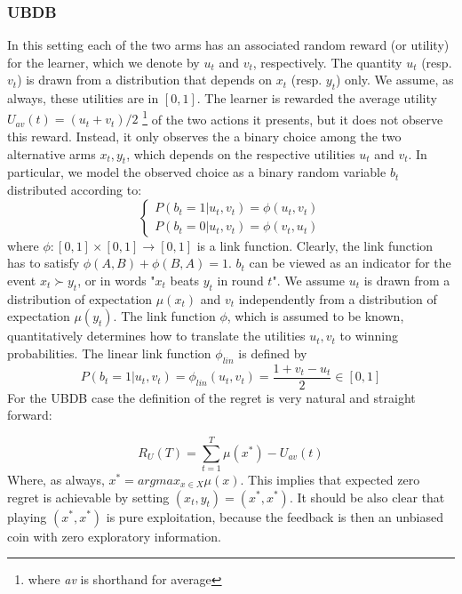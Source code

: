 \documentclass{llncs}
\begin{document}
	\subsubsection{UBDB}
		In this setting each of the two arms has an associated random reward (or utility) for the learner, which we denote by $u_t$ and $v_t$, respectively.
		The quantity $u_t$ (resp. $v_t$) is drawn from a distribution that depends on $x_t$ (resp. $y_t$) only.  
		We assume, as always, these utilities are in $[0, 1]$. 
		The learner is rewarded the average utility $ U_{av}(t) = (u_t + v_t)/2$ \footnote{ where \textit{av} is shorthand for average} of the two actions it presents, but it does not observe this reward. 
		Instead, it only observes the a binary choice among the two alternative arms $x_t, y_t$, which depends on the respective utilities $u_t$ and $v_t$. 
		In particular, we model the observed choice as a binary random variable $b_t$ distributed according to:
		\begin{equation}\label{eq:b_t}
		\begin{cases}
		P(b_t = 1|u_t, v_t) = \phi(u_t, v_t)
		\\
		P(b_t = 0|u_t, v_t) = \phi(v_t, u_t)
		\end{cases}
		\end{equation}			
	where $\phi:[0, 1] \times [0, 1] \rightarrow [0, 1]$ is a link function. 
	Clearly, the link function has to satisfy $\phi(A, B) + \phi(B, A) = 1$.
	$b_t$ can be viewed as an indicator for the event $x_t \succ y_t $, or in words "$x_t$ beats $y_t$ in round $t$".
	We assume $u_t$ is drawn from a distribution of expectation $\mu(x_t)$ and $v_t$ independently from a distribution of expectation $\mu(y_t)$.
	The link function $\phi$, which is assumed to be known, quantitatively determines how to translate the utilities $u_t, v_t$ to winning probabilities. 
	The linear link function $\phi_{lin}$ is defined by
	\begin{equation}\label{eq:link_function}
		P(b_t = 1|u_t, v_t) = \phi_{lin}(u_t, v_t) = \frac{1+v_t-u_t}{2}\in [0,1]
	\end{equation}
	For the UBDB case the definition of the regret is very natural and straight forward:

	\begin{equation}\label{eq:utility_regret}
		R_U(T) = \sum_{t=1}^T \mu(x^*)-U_{av}(t)
	\end{equation}	
	Where, as always,  $x^* = argmax_{x \in X} \mu(x)$. 
	This implies that expected zero regret is achievable by setting $(x_t, y_t) = (x^*,x^*)$.
	It should be also clear that playing $(x^*,x^*)$ is pure exploitation, because the feedback is then an unbiased coin with zero exploratory information.
	
\end{document}
